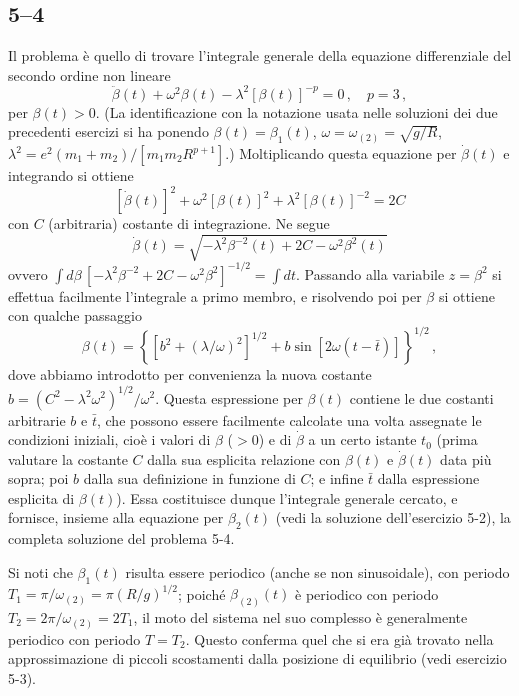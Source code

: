 \documentclass[11pt, a4paper]{book}
\numberwithin{equation}{section}
\begin{document}
\subsection*{5--4}
Il problema è quello di trovare l'integrale generale della equazione
differenziale del secondo ordine non lineare
\[
    \ddot{\beta}(t) + \omega^2\beta(t) - \lambda^2[\beta(t)]^{-p} = 0\,, \quad p=3\,,
\]
per $\beta(t)>0$. (La identificazione con la notazione usata nelle soluzioni dei
due precedenti esercizi si ha ponendo $\beta(t)=\beta_1(t)$,
$\omega=\omega_{(2)}=\sqrt{g/R}$,
$\lambda^2=e^2(m_1+m_2)/[m_1m_2 R^{p+1}]$.)
Moltiplicando questa equazione per $\dot{\beta}(t)$ e integrando si ottiene
\[
    [\dot{\beta}(t)]^2 + \omega^2[\beta(t)]^2 + \lambda^2[\beta(t)]^{-2} = 2C
\]
con $C$ (arbitraria) costante di integrazione. Ne segue
\[
    \dot{\beta}(t) = \sqrt{-\lambda^2\beta^{-2}(t) + 2C - \omega^2\beta^2(t)}
\]
ovvero $\int d\beta\,[-\lambda^2\beta^{-2}+2C-\omega^2\beta^2]^{-1/2} = \int dt$.
Passando alla variabile $z=\beta^2$ si effettua facilmente l'integrale a primo
membro, e risolvendo poi per $\beta$ si ottiene con qualche passaggio
\[
    \beta(t) = \left\{
    \left[b^2+(\lambda/\omega)^2\right]^{1/2}
    + b\sin[2\omega(t-\bar{t})]
    \right\}^{1/2} \,,
\]
dove abbiamo introdotto per convenienza la nuova costante
$b = (C^2-\lambda^2\omega^2)^{1/2}/\omega^2$.
Questa espressione per $\beta(t)$ contiene le due costanti arbitrarie $b$ e
$\bar{t}$, che possono essere facilmente calcolate una volta assegnate le
condizioni iniziali, cioè i valori di $\beta$ ($>0$) e di $\dot{\beta}$ a un
certo istante $t_0$ (prima valutare la costante $C$ dalla sua esplicita
relazione con $\beta(t)$ e $\dot{\beta}(t)$ data più sopra; poi $b$ dalla sua
definizione in funzione di $C$; e infine $\bar{t}$ dalla espressione esplicita di
$\beta(t)$). Essa costituisce dunque l'integrale generale cercato, e fornisce,
insieme alla equazione per $\beta_2(t)$ (vedi la soluzione dell'esercizio 5-2),
la completa soluzione del problema 5-4.

Si noti che $\beta_1(t)$ risulta essere periodico (anche se non sinusoidale),
con periodo $T_1 = \pi/\omega_{(2)} = \pi(R/g)^{1/2}$; poiché $\beta_{(2)}(t)$ è
periodico con periodo $T_2 = 2\pi/\omega_{(2)} = 2T_1$, il moto del sistema nel
suo complesso è generalmente periodico con periodo $T=T_2$. Questo conferma
quel che si era già trovato nella approssimazione di piccoli scostamenti dalla
posizione di equilibrio (vedi esercizio 5-3).
\end{document}
